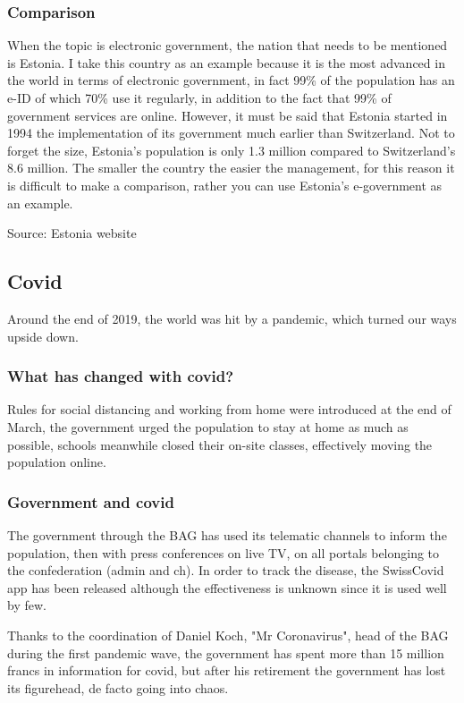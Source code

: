 \subsubsection*{Comparison}
When the topic is electronic government, the nation that needs to be mentioned is Estonia.
I take this country as an example because it is the most advanced in the world in terms of electronic government, in fact 99\% of the population has an e-ID of which 70\% use it regularly, in addition to the fact that 99\% of government services are online.
However, it must be said that Estonia started in 1994 the implementation of its government much earlier than Switzerland.
Not to forget the size, Estonia's population is only 1.3 million compared to Switzerland's 8.6 million.
The smaller the country the easier the management, for this reason it is difficult to make a comparison, rather you can use Estonia's e-government as an example.

Source: Estonia website \cite{Estonia}

\subsection{Covid}
Around the end of 2019, the world was hit by a pandemic, which turned our ways upside down.
\subsubsection*{What has changed with covid?}
Rules for social distancing and working from home were introduced at the end of March, the government urged the population to stay at home as much as possible, schools meanwhile closed their on-site classes, effectively moving the population online.

\subsubsection*{Government and covid}
The government through the BAG has used its telematic channels to inform the population, then with press conferences on live TV, on all portals belonging to the confederation (admin and ch).
In order to track the disease, the SwissCovid app has been released although the effectiveness is unknown since it is used well by few.

Thanks to the coordination of Daniel Koch, "Mr Coronavirus", head of the BAG during the first pandemic wave, the government has spent more than 15 million francs in information for covid, but after his retirement the government has lost its figurehead, de facto going into chaos.

